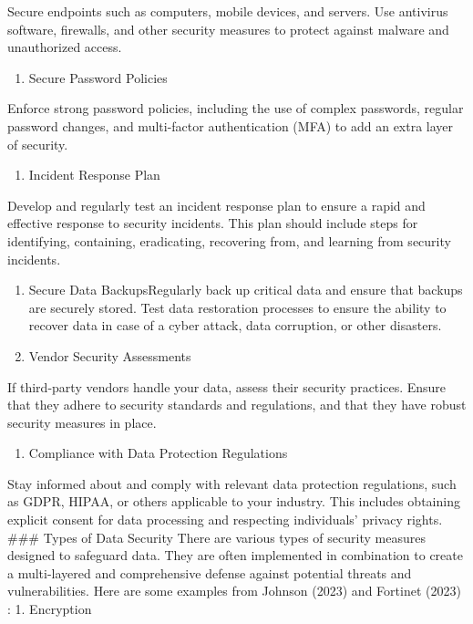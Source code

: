 \documentclass[
  letterpaper,
  DIV=11,
  numbers=noendperiod]{scrreprt}
\providecommand{\tightlist}{%
  \setlength{\itemsep}{0pt}\setlength{\parskip}{0pt}}\usepackage{longtable,booktabs,array}
\begin{document}
Secure endpoints such as computers, mobile devices, and servers. Use
antivirus software, firewalls, and other security measures to protect
against malware and unauthorized access.

\begin{enumerate}
\def\labelenumi{\arabic{enumi}.}
\setcounter{enumi}{8}
\tightlist
\item
  Secure Password Policies
\end{enumerate}

Enforce strong password policies, including the use of complex
passwords, regular password changes, and multi-factor authentication
(MFA) to add an extra layer of security.

\begin{enumerate}
\def\labelenumi{\arabic{enumi}.}
\setcounter{enumi}{9}
\tightlist
\item
  Incident Response Plan
\end{enumerate}

Develop and regularly test an incident response plan to ensure a rapid
and effective response to security incidents. This plan should include
steps for identifying, containing, eradicating, recovering from, and
learning from security incidents.

\begin{enumerate}
\def\labelenumi{\arabic{enumi}.}
\setcounter{enumi}{10}
\item
  Secure Data BackupsRegularly back up critical data and ensure that
  backups are securely stored. Test data restoration processes to ensure
  the ability to recover data in case of a cyber attack, data
  corruption, or other disasters.
\item
  Vendor Security Assessments
\end{enumerate}

If third-party vendors handle your data, assess their security
practices. Ensure that they adhere to security standards and
regulations, and that they have robust security measures in place.

\begin{enumerate}
\def\labelenumi{\arabic{enumi}.}
\setcounter{enumi}{12}
\tightlist
\item
  Compliance with Data Protection Regulations
\end{enumerate}

Stay informed about and comply with relevant data protection
regulations, such as GDPR, HIPAA, or others applicable to your industry.
This includes obtaining explicit consent for data processing and
respecting individuals' privacy rights. \#\#\# Types of Data Security
There are various types of security measures designed to safeguard data.
They are often implemented in combination to create a multi-layered and
comprehensive defense against potential threats and vulnerabilities.
Here are some examples from Johnson (2023) and Fortinet (2023) : 1.
Encryption
\end{document}
